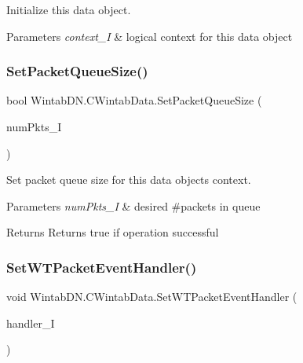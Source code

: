 Initialize this data object. 


\begin{DoxyParams}{Parameters}
{\em context\+\_\+I} & logical context for this data object\\
\hline
\end{DoxyParams}
\mbox{\label{class_wintab_d_n_1_1_c_wintab_data_a3fc4761704097caa1e7378a0859db387}} 
\subsubsection{\texorpdfstring{Set\+Packet\+Queue\+Size()}{SetPacketQueueSize()}}
{\footnotesize\ttfamily bool Wintab\+D\+N.\+C\+Wintab\+Data.\+Set\+Packet\+Queue\+Size (\begin{DoxyParamCaption}\item[{U\+Int32}]{num\+Pkts\+\_\+I }\end{DoxyParamCaption})\hspace{0.3cm}{\ttfamily [inline]}}



Set packet queue size for this data object\textquotesingle{}s context. 


\begin{DoxyParams}{Parameters}
{\em num\+Pkts\+\_\+I} & desired \#packets in queue\\
\hline
\end{DoxyParams}
\begin{DoxyReturn}{Returns}
Returns true if operation successful
\end{DoxyReturn}
\mbox{\label{class_wintab_d_n_1_1_c_wintab_data_a986ef88b57d732ff3703a2c802fa62e7}} 
\subsubsection{\texorpdfstring{Set\+W\+T\+Packet\+Event\+Handler()}{SetWTPacketEventHandler()}}
{\footnotesize\ttfamily void Wintab\+D\+N.\+C\+Wintab\+Data.\+Set\+W\+T\+Packet\+Event\+Handler (\begin{DoxyParamCaption}\item[{Event\+Handler$<$ \mbox{\hyperlink{class_wintab_d_n_1_1_message_received_event_args}{Message\+Received\+Event\+Args}} $>$}]{handler\+\_\+I }\end{DoxyParamCaption})\hspace{0.3cm}{\ttfamily [inline]}}



